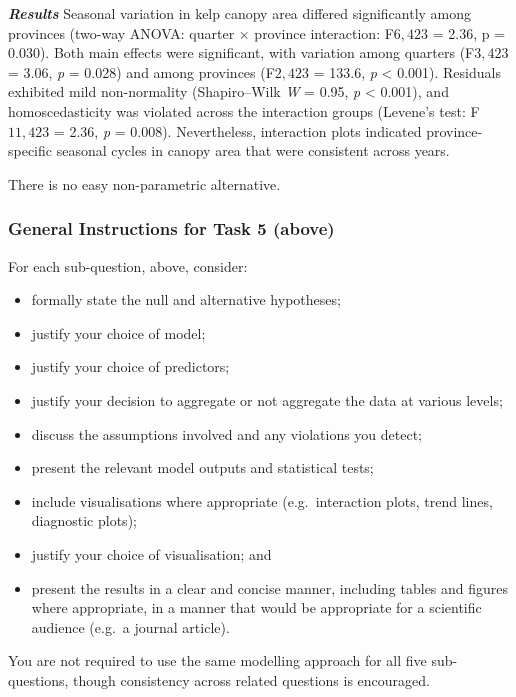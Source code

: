 \documentclass[
  british,
  10pt,
]{article}
\providecommand{\tightlist}{%
  \setlength{\itemsep}{0pt}\setlength{\parskip}{0pt}}
\begin{document}
\textbf{\emph{Results}} Seasonal variation in kelp canopy area differed
significantly among provinces (two-way ANOVA: quarter × province
interaction: F\({6,423}\) = 2.36, p = 0.030). Both main effects were
significant, with variation among quarters (F\({3,423}\) = 3.06,
\emph{p} = 0.028) and among provinces (F\({2,423}\) = 133.6, \emph{p}
\textless{} 0.001). Residuals exhibited mild non-normality
(Shapiro--Wilk \emph{W} = 0.95, \emph{p} \textless{} 0.001), and
homoscedasticity was violated across the interaction groups (Levene's
test: F\({11,423}\) = 2.36, \emph{p} = 0.008). Nevertheless, interaction
plots indicated province-specific seasonal cycles in canopy area that
were consistent across years.

There is no easy non-parametric alternative.

\subsubsection{General Instructions for Task 5
(above)}\label{general-instructions-for-task-5-above}

For each sub-question, above, consider:

\begin{itemize}
\tightlist
\item
  formally state the null and alternative hypotheses;
\item
  justify your choice of model;
\item
  justify your choice of predictors;
\item
  justify your decision to aggregate or not aggregate the data at
  various levels;
\item
  discuss the assumptions involved and any violations you detect;
\item
  present the relevant model outputs and statistical tests;
\item
  include visualisations where appropriate (e.g.~interaction plots,
  trend lines, diagnostic plots);
\item
  justify your choice of visualisation; and
\item
  present the results in a clear and concise manner, including tables
  and figures where appropriate, in a manner that would be appropriate
  for a scientific audience (e.g.~a journal article).
\end{itemize}

You are not required to use the same modelling approach for all five
sub-questions, though consistency across related questions is
encouraged.
\end{document}
